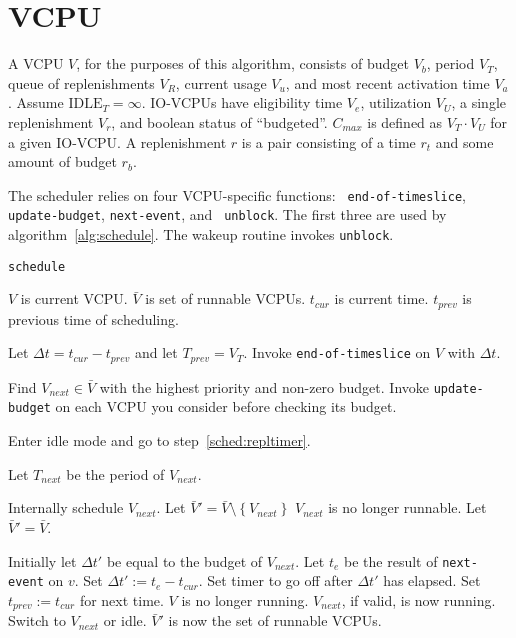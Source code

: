 \documentclass{article}
\newcommand\set[1]{\left\{ {#1} \right\}}
\begin{document}
\newpage
\section{VCPU}


A VCPU $V$, for the purposes of this algorithm, consists of budget
$V_b$, period $V_T$, queue of replenishments $V_R$, current usage
$V_u$, and most recent activation time $V_a$.  Assume
$\text{IDLE}_T=\infty$.  IO-VCPUs have eligibility time $V_e$,
utilization $V_U$, a single replenishment $V_r$, and boolean status of
``budgeted''.  $C_{max}$ is defined as $V_T\cdot V_U$ for a given
IO-VCPU.  A replenishment $r$ is a pair consisting of a time $r_t$ and
some amount of budget $r_b$.

The scheduler relies on four VCPU-specific functions: {\tt
  end-of-timeslice}, {\tt update-budget}, {\tt next-event}, and {\tt
  unblock}.  The first three are used by algorithm~\ref{alg:schedule}.
The wakeup routine invokes {\tt unblock}.

\begin{algorithm}
  \caption{\tt schedule}\label{alg:schedule}
  \begin{algorithmic}[1]
    \REQUIRE $V$ is current VCPU.
    \REQUIRE $\bar V$ is set of runnable VCPUs.
    \REQUIRE $t_{cur}$ is current time.
    \REQUIRE $t_{prev}$ is previous time of scheduling.

    \STATE Let $\Delta t=t_{cur}-t_{prev}$ and let $T_{prev}=V_T$.
    \STATE Invoke {\tt end-of-timeslice} on $V$ with $\Delta t$.

    \STATE Find $V_{next}\in\bar V$ with the highest priority and
    non-zero budget.  Invoke {\tt update-budget} on each VCPU you
    consider before checking its budget.

    \STATE Enter idle mode and go to step~\ref{sched:repltimer}.
    \ENDIF

    \STATE Let $T_{next}$ be the period of $V_{next}$.

    \STATE Internally schedule $V_{next}$.
    \STATE Let $\bar V'=\bar V\setminus\set{V_{next}}$
    \STATE $V_{next}$ is no longer runnable.
    \ELSE
    \STATE Let $\bar V'=\bar V$.
    \ENDIF

    \STATE Initially let $\Delta t'$ be equal to the budget of $V_{next}$.
    \STATE Let $t_e$ be the result of {\tt next-event} on $v$.
    \STATE Set $\Delta t':=t_e-t_{cur}$.\ENDIF
    \ENDFOR
    \STATE Set timer to go off after $\Delta t'$ has elapsed.
    \STATE Set $t_{prev}:=t_{cur}$ for next time.
    \STATE $V$ is no longer running.  $V_{next}$, if valid, is now running.
    \STATE Switch to $V_{next}$ or idle.
    \ENSURE $\bar V'$ is now the set of runnable VCPUs.
  \end{algorithmic}
\end{algorithm}
\end{document}
